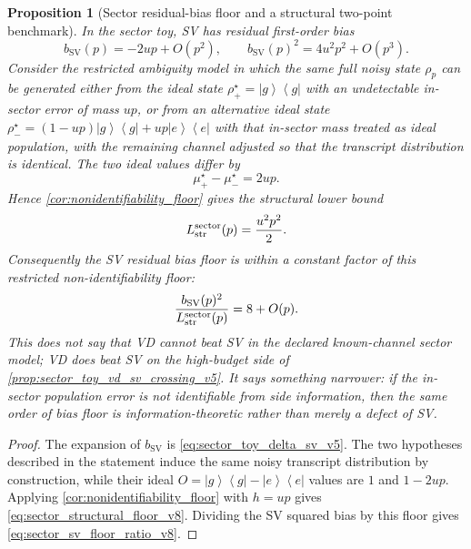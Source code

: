 \documentclass[11pt]{article}
\newtheorem{proposition}{Proposition}
\newcommand{\1}{\mathbf{1}}
\newcommand{\bra}[1]{\left\langle #1\right|}
\newcommand{\ket}[1]{\left|#1\right\rangle}
\begin{document}
\begin{proposition}[Sector residual-bias floor and a structural two-point benchmark]
\label{prop:sector_structural_floor_v8}
In the sector toy, SV has residual first-order bias
\begin{equation}
    b_{\mathrm{SV}}(p)=-2up+O(p^2),
    \qquad
    b_{\mathrm{SV}}(p)^2=4u^2p^2+O(p^3).
\end{equation}
Consider the restricted ambiguity model in which the same full noisy state \(\rho_p\) can be generated either from the ideal state \(\rho_+^\star=\ket g\bra g\) with an undetectable in-sector error of mass \(up\), or from an alternative ideal state \(\rho_-^\star=(1-up)\ket g\bra g+up\ket e\bra e\) with that in-sector mass treated as ideal population, with the remaining channel adjusted so that the transcript distribution is identical.  The two ideal values differ by
\begin{equation}
    \mu_+^\star-\mu_-^\star=2up.
\end{equation}
Hence \cref{cor:nonidentifiability_floor} gives the structural lower bound
\begin{equation}
    L_{\rm str}^{\rm sector}(p)=\frac{u^2p^2}{2}.
    \label{eq:sector_structural_floor_v8}
\end{equation}
Consequently the SV residual bias floor is within a constant factor of this restricted non-identifiability floor:
\begin{equation}
    \frac{b_{\mathrm{SV}}(p)^2}{L_{\rm str}^{\rm sector}(p)}
    =8+O(p).
    \label{eq:sector_sv_floor_ratio_v8}
\end{equation}
This does not say that VD cannot beat SV in the declared known-channel sector model; VD does beat SV on the high-budget side of \cref{prop:sector_toy_vd_sv_crossing_v5}.  It says something narrower: if the in-sector population error is not identifiable from side information, then the same order of bias floor is information-theoretic rather than merely a defect of SV\@.
\end{proposition}

\begin{proof}
The expansion of \(b_{\mathrm{SV}}\) is \cref{eq:sector_toy_delta_sv_v5}.  The two hypotheses described in the statement induce the same noisy transcript distribution by construction, while their ideal \(O=\ket g\bra g-\ket e\bra e\) values are \(1\) and \(1-2up\).  Applying \cref{cor:nonidentifiability_floor} with \(h=up\) gives \cref{eq:sector_structural_floor_v8}.  Dividing the SV squared bias by this floor gives \cref{eq:sector_sv_floor_ratio_v8}.
\end{proof}
\end{document}
